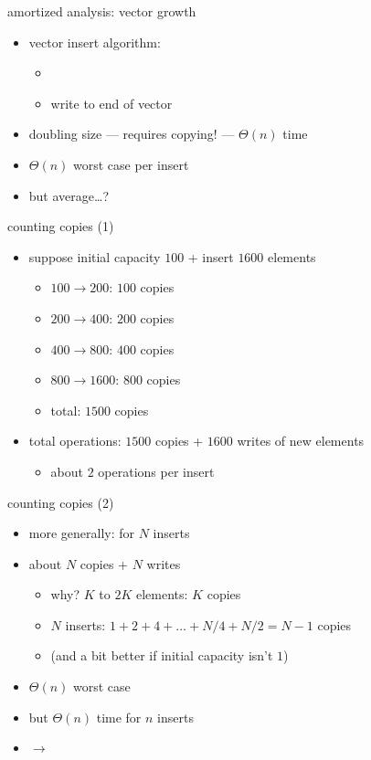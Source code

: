 \begin{frame}{amortized analysis: vector growth}
    \begin{itemize}
    \item vector insert algorithm:
        \begin{itemize}
        \item {}
        \item write to end of vector
        \end{itemize}
    \item<2-> doubling size --- requires copying! --- $\Theta(n)$ time
    \item<2-> $\Theta(n)$ worst case per insert
    \item<2-> but average\ldots?
    \end{itemize}
\end{frame}

\begin{frame}{counting copies (1)}
    \begin{itemize}
    \item suppose initial capacity $100$ + insert $1600$ elements
    \begin{itemize}
        \item $100\rightarrow 200$: $100$ copies
        \item $200\rightarrow 400$: $200$ copies
        \item $400\rightarrow 800$: $400$ copies
        \item $800\rightarrow 1600$: $800$ copies
        \item total: $1500$ copies
    \end{itemize}
    \item total operations: $1500$ copies + $1600$ writes of new elements
        \begin{itemize}
        \item about $2$ operations per insert
        \end{itemize}
    \end{itemize}
\end{frame}

\begin{frame}{counting copies (2)}
    \begin{itemize}
    \item more generally: for $N$ inserts
    \item about $N$ copies + $N$ writes
        \begin{itemize}
        \item why? $K$ to $2K$ elements: $K$ copies
        \item $N$ inserts: $1 + 2 + 4 + \ldots + N/4 + N/2 = N - 1$ copies
        \item (and a bit better if initial capacity isn't $1$)
        \end{itemize}
    \item<2-> $\Theta(n)$ worst case
    \item<2-> but $\Theta(n)$ time for $n$ inserts
    \item<2-> $\rightarrow$ 
    \end{itemize}
\end{frame}

